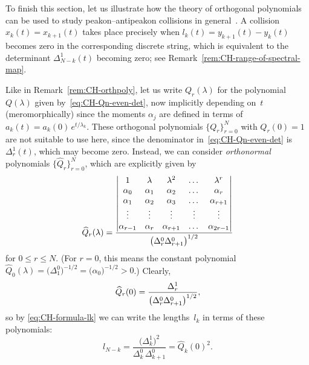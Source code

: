\documentclass[10pt,a4paper]{article} \pdfoutput=1 
\begin{document}
To finish this section, let us illustrate how the theory of orthogonal polynomials
can be used to study peakon--antipeakon collisions in general~\cite{beals-sattinger-szmigielski:2000:moment}.
A collision $x_k(t) = x_{k+1}(t)$ takes place precisely when
$l_k(t) = y_{k+1}(t) - y_k(t)$ becomes zero in the corresponding discrete string,
which is equivalent to the determinant $\Delta_{N-k}^1(t)$ becoming zero;
see Remark~\ref{rem:CH-range-of-spectral-map}.

Like in Remark~\ref{rem:CH-orthpoly}, let us write $Q_r(\lambda)$ for the polynomial $Q(\lambda)$
given by~\eqref{eq:CH-Qn-even-det},
now implicitly depending on~$t$ (meromorphically) since the moments $\alpha_j$ are defined in terms of
$a_k(t) = a_k(0) \, e^{t/\lambda_k}$.
These orthogonal polynomials $\{ Q_r \}_{r=0}^N$
with $Q_r(0)=1$ are not suitable to use here, since the denominator in~\eqref{eq:CH-Qn-even-det}
is~$\Delta^1_{r}(t)$, which may become zero.
Instead, we can consider \emph{orthonormal} polynomials $\{ \widehat Q_r \}_{r=0}^N$,
which are explicitly given by
\begin{equation}
  \label{eq:CH-orthopol}
  \widehat Q_r(\lambda) =
  \frac{
    \begin{vmatrix}
      1 & \lambda & \lambda^2 & \dots & \lambda^r \\
      \alpha_0 & \alpha_1 & \alpha_2 & \dots & \alpha_r \\
      \alpha_1 & \alpha_2 & \alpha_3 & \dots &  \alpha_{r+1} \\
      \vdots & \vdots & \vdots & \vdots & \vdots \\
      \alpha_{r-1} & \alpha_r & \alpha_{r+1} & \dots & \alpha_{2r-1}
    \end{vmatrix}
  }{\bigl( \Delta^0_{r} \Delta^0_{\vphantom{r} \smash{r+1}} \bigr)^{1/2}}
\end{equation}
for $0 \le r \le N$.
(For $r=0$, this means the constant polynomial
$\widehat Q_0(\lambda) = \bigl( \Delta^0_{1} \bigr)^{-1/2} = \bigl( \alpha_0 \bigr)^{-1/2} > 0$.)
Clearly,
\begin{equation}
  \label{eq:CH-Qhat-zero}
  \widehat Q_r(0) = \frac{\Delta^1_r}{\bigl( \Delta^0_{r} \Delta^0_{\vphantom{r} \smash{r+1}} \bigr)^{1/2}}
  ,
\end{equation}
so by \eqref{eq:CH-formula-lk} we can write the lengths~$l_k$ in terms of these polynomials:
\begin{equation}
  \label{eq:CH-l-Qhat}
  l_{N-k} = \frac{\bigl( \Delta_{k}^1 \bigr)^2}{\Delta_{k}^0 \, \Delta_{k+1}^0}
  = \widehat Q_{k}(0)^2
  .
\end{equation}
\end{document}
